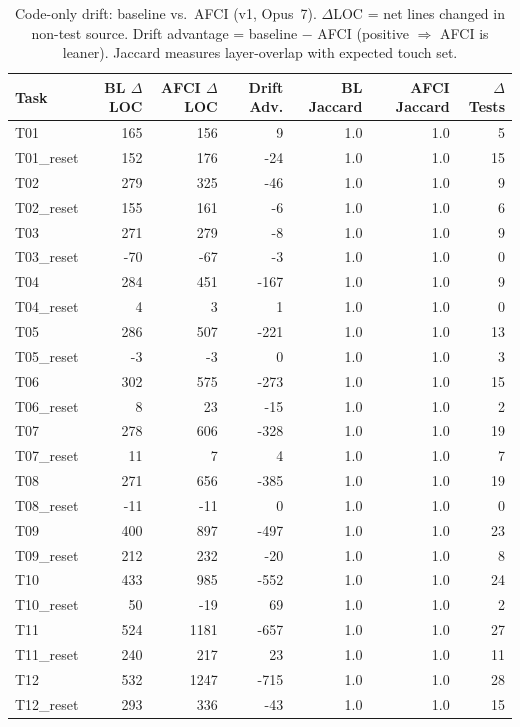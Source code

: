 \begin{table}[t]
\centering
\caption{Code-only drift: baseline vs.\ AFCI (v1, Opus~7). $\Delta$LOC = net lines changed in non-test source. Drift advantage = baseline $-$ AFCI (positive $\Rightarrow$ AFCI is leaner). Jaccard measures layer-overlap with expected touch set.}
\label{tab:drift-v1}
\footnotesize
\setlength{\tabcolsep}{4pt}
\renewcommand{\arraystretch}{1.05}
\begin{tabular}{lrrrrrr}
\toprule
Task & BL $\Delta$LOC & AFCI $\Delta$LOC & Drift Adv. & BL Jaccard & AFCI Jaccard & $\Delta$Tests \\
\midrule
  T01 & 165 & 156 & 9 & 1.0 & 1.0 & 5 \\
  T01\_reset & 152 & 176 & -24 & 1.0 & 1.0 & 15 \\
  T02 & 279 & 325 & -46 & 1.0 & 1.0 & 9 \\
  T02\_reset & 155 & 161 & -6 & 1.0 & 1.0 & 6 \\
  T03 & 271 & 279 & -8 & 1.0 & 1.0 & 9 \\
  T03\_reset & -70 & -67 & -3 & 1.0 & 1.0 & 0 \\
  T04 & 284 & 451 & -167 & 1.0 & 1.0 & 9 \\
  T04\_reset & 4 & 3 & 1 & 1.0 & 1.0 & 0 \\
  T05 & 286 & 507 & -221 & 1.0 & 1.0 & 13 \\
  T05\_reset & -3 & -3 & 0 & 1.0 & 1.0 & 3 \\
  T06 & 302 & 575 & -273 & 1.0 & 1.0 & 15 \\
  T06\_reset & 8 & 23 & -15 & 1.0 & 1.0 & 2 \\
  T07 & 278 & 606 & -328 & 1.0 & 1.0 & 19 \\
  T07\_reset & 11 & 7 & 4 & 1.0 & 1.0 & 7 \\
  T08 & 271 & 656 & -385 & 1.0 & 1.0 & 19 \\
  T08\_reset & -11 & -11 & 0 & 1.0 & 1.0 & 0 \\
  T09 & 400 & 897 & -497 & 1.0 & 1.0 & 23 \\
  T09\_reset & 212 & 232 & -20 & 1.0 & 1.0 & 8 \\
  T10 & 433 & 985 & -552 & 1.0 & 1.0 & 24 \\
  T10\_reset & 50 & -19 & 69 & 1.0 & 1.0 & 2 \\
  T11 & 524 & 1181 & -657 & 1.0 & 1.0 & 27 \\
  T11\_reset & 240 & 217 & 23 & 1.0 & 1.0 & 11 \\
  T12 & 532 & 1247 & -715 & 1.0 & 1.0 & 28 \\
  T12\_reset & 293 & 336 & -43 & 1.0 & 1.0 & 15 \\
\bottomrule
\end{tabular}
\end{table}
